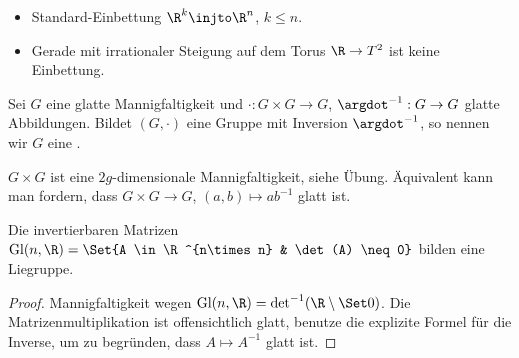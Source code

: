 \begin{ex}
    \begin{itemize}
        \item
            Standard-Einbettung $\R^k \injto \R^n$, $k \le n$.
        \item
            Gerade mit irrationaler Steigung auf dem Torus $\R \to T^2$ ist keine Einbettung.
    \end{itemize}
\end{ex}

\begin{df} \label{2.7}
    Sei $G$ eine glatte Mannigfaltigkeit und $\cdot: G \times G \to G$, $\argdot^{-1}: G \to G$ glatte Abbildungen.
    Bildet $(G, \cdot)$ eine Gruppe mit Inversion $\argdot^{-1}$, so nennen wir $G$ eine .
    \begin{note}
        $G \times G$ ist eine $2g$-dimensionale Mannigfaltigkeit, siehe Übung.
        Äquivalent kann man fordern, dass $G\times G \to G$, $(a,b) \mapsto ab^{-1}$ glatt ist.
    \end{note}
\end{df}

\begin{ex}
    Die invertierbaren Matrizen
    \begin{math}
        \Gl(n,\R) = \Set{A \in \R^{n\times n} & \det(A) \neq 0}
    \end{math}
    bilden eine Liegruppe.
    \begin{proof}
        Mannigfaltigkeit wegen $\Gl(n,\R) = \det^{-1}(\R \setminus \Set 0)$.
        Die Matrizenmultiplikation ist offensichtlich glatt, benutze die explizite Formel für die Inverse, um zu begründen, dass $A \mapsto A^{-1}$ glatt ist.
    \end{proof}
\end{ex}
